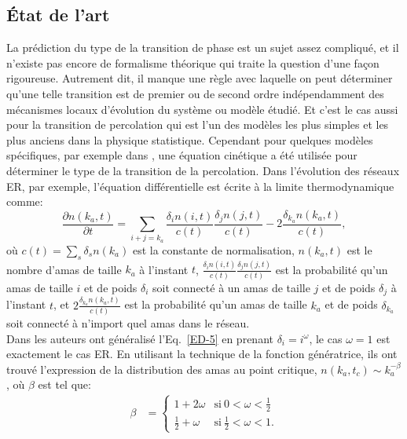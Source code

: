 \subsection{\'{E}tat de l'art}
La prédiction du type de la transition de phase est un sujet assez compliqué, et il n'existe pas encore de formalisme théorique qui traite la question d'une façon rigoureuse. Autrement dit, il manque une règle avec laquelle on peut déterminer qu'une telle transition est de premier ou de second ordre indépendamment des mécanismes locaux d'évolution du système ou modèle étudié. Et c'est le cas aussi pour la transition de percolation qui est l'un des modèles les plus simples et les plus anciens dans la physique statistique. Cependant pour quelques modèles spécifiques, par exemple dans \cite{Cho-al2010}, une équation cinétique a été utilisée pour déterminer le type de la transition de la percolation. Dans l'évolution des réseaux ER, par exemple, l'équation différentielle est écrite à la limite thermodynamique comme:
\begin{equation}
\frac{\partial n(k_a,t)}{\partial t}=\sum_{i+j=k_a}\frac{\delta_in(i,t)}{c(t)}\frac{\delta_jn(j,t)}{c(t)}-2\frac{\delta_{k_a}n(k_a,t)}{c(t)},
\label{ED-5}
\end{equation}
où $c(t)=\sum_{s}\delta_sn(k_a)$ est la constante de normalisation, $n(k_a,t)$ est le nombre d'amas de taille $k_a$ à l'instant $t$, $\frac{\delta_in(i,t)}{c(t)}\frac{\delta_jn(j,t)}{c(t)}$ est la probabilité qu'un amas de taille $i$ et de poids $\delta_i$ soit connecté à un amas de taille $j$ et de poids $\delta_j$ à l'instant $t$, et $2\frac{\delta_{k_a}n(k_a,t)}{c(t)}$ est la probabilité qu'un amas de taille $k_a$ et de poids $\delta_{k_a}$ soit connecté à n'import quel amas dans le réseau.\\
Dans \cite{Cho-al2010,Cho2-Kahng2011} les auteurs ont généralisé l'Eq.~\eqref{ED-5} en prenant $\delta_i=i^{\omega}$, le cas $\omega=1$ est exactement le cas ER. En utilisant la technique de la fonction génératrice, ils ont trouvé l'expression de la distribution des amas au point critique, $n(k_a,t_c)\sim k_a^{-\beta}$, où $\beta$ est tel que:
\begin{align}
\beta &=
\begin{cases}
1+2\omega & \text{si}\ 0<\omega<\frac{1}{2} \\
\frac{1}{2}+\omega& \text{si}\ \frac{1}{2}<\omega<1.
\end{cases}
\label{gama}
\end{align}

